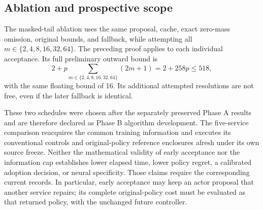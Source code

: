 \subsection{Ablation and prospective scope}
The masked-tail ablation uses the same proposal, cache, exact
zero-mass omission, original bounds, and fallback, while attempting
all $m\in\{2,4,8,16,32,64\}$.  The preceding proof applies to each
individual acceptance.  Its full preliminary outward bound is
\[
 2+p\sum_{m\in\{2,4,8,16,32,64\}}(2m+1)
      =2+258p\le518,
\]
with the same floating bound of 16.  Its additional attempted
resolutions are not free, even if the later fallback is identical.

These two schedules were chosen after the separately preserved
Phase A results and are therefore declared as Phase B algorithm
development.  The five-service comparison reacquires the common
training information and executes its conventional controls and
original-policy reference enclosures afresh under its own source
freeze.  Neither the mathematical validity of early acceptance nor
the information cap establishes lower elapsed time, lower policy
regret, a calibrated adoption decision, or neural specificity.
Those claims require the corresponding current records.  In
particular, early acceptance may keep an actor proposal that another
service repairs; its complete original-policy cost must be evaluated
as that returned policy, with the unchanged future controller.
